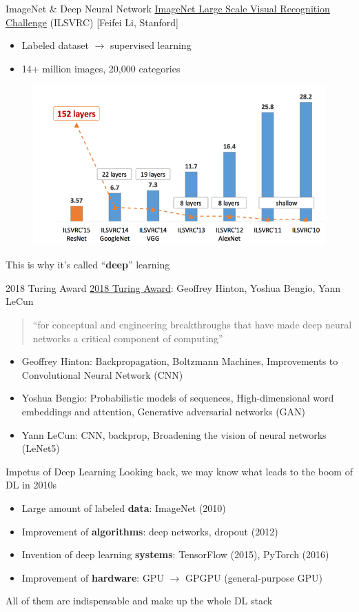 \documentclass{../TexTemplate/myslide}
\begin{document}
\begin{frame}{ImageNet \& Deep Neural Network}
\href{http://image-net.org/}{ImageNet Large Scale Visual Recognition Challenge} (ILSVRC) [Feifei Li, Stanford]
\begin{itemize}
	\item Labeled dataset $\to$ supervised learning
	\item 14+ million images, 20,000 categories
\end{itemize}
\begin{figure}
\centering
\includegraphics[width=0.7\linewidth]{fig/imagenet.png}
\end{figure}
This is why it's called ``\textbf{deep}'' learning\\
\end{frame}

\begin{frame}{2018 Turing Award}
\href{https://awards.acm.org/about/2018-turing}{2018 Turing Award}: Geoffrey Hinton, Yoshua Bengio, Yann LeCun
\\\bigskip
\begin{quote}
``for conceptual and engineering breakthroughs that have made deep neural networks a critical component of computing''
\end{quote}
\begin{itemize}
	\item Geoffrey Hinton: Backpropagation, Boltzmann Machines, Improvements to Convolutional Neural Network (CNN)
	\item Yoshua Bengio: Probabilistic models of sequences, High-dimensional word embeddings and attention, Generative adversarial networks (GAN)
	\item Yann LeCun: CNN, backprop, Broadening the vision of neural networks (LeNet5)
\end{itemize}
\end{frame}

\begin{frame}{Impetus of Deep Learning}
Looking back, we may know what leads to the boom of DL in 2010s
\begin{itemize}
	\item Large amount of labeled \textbf{data}: ImageNet (2010)
	\item Improvement of \textbf{algorithms}: deep networks, dropout (2012)
	\item Invention of deep learning \textbf{systems}: TensorFlow (2015), PyTorch (2016)
	\item Improvement of \textbf{hardware}: GPU $\to$ GPGPU (general-purpose GPU)
\end{itemize}
All of them are indispensable and make up the whole DL stack
\end{frame}
\end{document}
